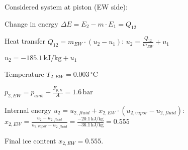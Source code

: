 Considered system at piston (EW side):  

Change in energy \( \Delta E = E_2 - m \cdot E_1 = Q_{12} \)  

Heat transfer \( Q_{12} = m_{EW} \cdot (u_2 - u_1) \):  
\( u_2 = \frac{Q_{12}}{m_{EW}} + u_1 \)  

\( u_2 = -185.1 \, \text{kJ/kg} + u_1 \)  

Temperature \( T_{2,EW} = 0.003 \, ^\circ \text{C} \)  

\( p_{2,EW} = p_{amb} + \frac{F_{p,K}}{A} = 1.6 \, \text{bar} \)  

Internal energy \( u_2 = u_{2,fluid} + x_{2,EW} \cdot (u_{2,vapor} - u_{2,fluid}) \):  
\( x_{2,EW} = \frac{u_2 - u_{2,fluid}}{u_{2,vapor} - u_{2,fluid}} = \frac{-20.1 \, \text{kJ/kg}}{-36.1 \, \text{kJ/kg}} = 0.555 \)  

Final ice content \( x_{2,EW} = 0.555 \).